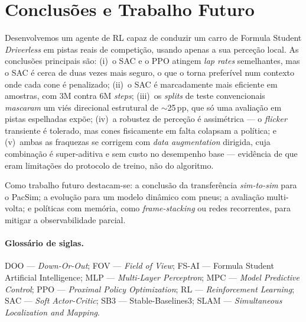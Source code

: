 \documentclass[runningheads]{llncs}
\begin{document}
\section{Conclusões e Trabalho Futuro}

Desenvolvemos um agente de RL capaz de conduzir um carro de Formula Student \textit{Driverless} em pistas reais de competição, usando apenas a sua perceção local. As conclusões principais são: (i)~o SAC e o PPO atingem \textit{lap rates} semelhantes, mas o SAC é cerca de duas vezes mais seguro, o que o torna preferível num contexto onde cada cone é penalizado; (ii)~o SAC é marcadamente mais eficiente em amostras, com 3M contra 6M \textit{steps}; (iii)~os \textit{splits} de teste convencionais \emph{mascaram} um viés direcional estrutural de $\sim$25\,pp, que só uma avaliação em pistas espelhadas expõe; (iv)~a robustez de perceção é assimétrica --- o \textit{flicker} transiente é tolerado, mas cones fisicamente em falta colapsam a política; e (v)~ambas as fraquezas se corrigem com \textit{data augmentation} dirigida, cuja combinação é super-aditiva e sem custo no desempenho base --- evidência de que eram limitações do protocolo de treino, não do algoritmo.

Como trabalho futuro destacam-se: a conclusão da transferência \textit{sim-to-sim} para o PacSim; a evolução para um modelo dinâmico com pneus; a avaliação multi-volta; e políticas com memória, como \textit{frame-stacking} ou redes recorrentes, para mitigar a observabilidade parcial.

\paragraph{Glossário de siglas.} {\small DOO --- \textit{Down-Or-Out}; FOV --- \textit{Field of View}; FS-AI --- Formula Student Artificial Intelligence; MLP --- \textit{Multi-Layer Perceptron}; MPC --- \textit{Model Predictive Control}; PPO --- \textit{Proximal Policy Optimization}; RL --- \textit{Reinforcement Learning}; SAC --- \textit{Soft Actor-Critic}; SB3 --- Stable-Baselines3; SLAM --- \textit{Simultaneous Localization and Mapping}.}
\end{document}
